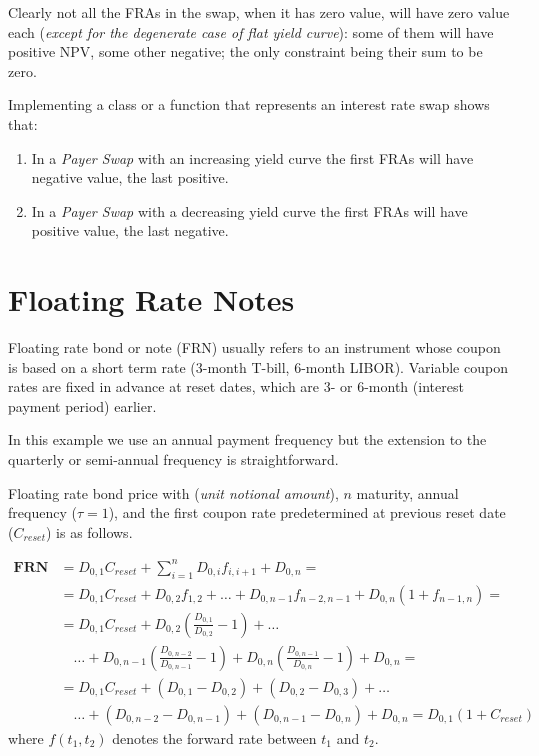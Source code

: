\documentclass[12pt,a4paper]{article}
\begin{document}
Clearly not all the FRAs in the swap, when it has zero value, will have zero value each (\emph{except for the degenerate case of flat yield curve}): some of them will have positive NPV, some other negative; the only constraint being their sum to be zero.

\begin{question}
Implementing a class or a function that represents an interest rate swap shows that:
\begin{enumerate}
\item In a \emph{Payer Swap} with an increasing yield curve the first FRAs will have negative value, the last positive. 
\item In a \emph{Payer Swap} with a decreasing yield curve the first FRAs will have positive value, the last negative.
\end{enumerate}
\end{question}

\clearpage
\section{Floating Rate Notes}
Floating rate bond or note (FRN) usually refers to an instrument whose coupon is based on a short term rate (3-month T-bill, 6-month LIBOR). Variable coupon rates are fixed in advance at reset dates, which are 3- or 6-month (interest payment period) earlier.

In this example we use an annual payment frequency but the extension to the quarterly or semi-annual frequency is straightforward.

Floating rate bond price with (\emph{unit notional amount}), $n$ maturity, annual frequency ($\tau=1$), and the first coupon rate predetermined at previous reset date ($C_{reset}$) is as follows.

\begin{equation}
	\begin{aligned}
		\textbf{FRN} & = D_{0,1}C_{reset} + \sum_{i=1}^nD_{0,i}f_{i,i+1} + D_{0,n}= \\
		& = D_{0,1}C_{reset} + D_{0,2}f_{1,2} + \ldots + D_{0,n-1}f_{n-2,n-1}+ D_{0,n}(1+f_{n-1,n}) = \\
		& = D_{0,1}C_{reset} + D_{0,2}\left(\frac{D_{0,1}}{D_{0,2}}-1\right) + \ldots \\
		&\quad\ldots + D_{0,n-1}\left(\frac{D_{0,n-2}}{D_{0,n-1}}-1\right) + D_{0,n}\left(\frac{D_{0,n-1}}{D_{0,n}}-1\right) + D_{0,n} = \\
		& = D_{0,1}C_{reset} + (D_{0,1} - D_{0,2}) + (D_{0,2} - D_{0,3}) + \ldots \\
		&\quad\ldots + (D_{0,n-2} - D_{0,n-1}) + (D_{0,n-1} - D_{0,n}) + D_{0,n} = \boxed{D_{0,1} (1 +C_{reset})}
	\end{aligned}
\end{equation}
where $f(t_1,t_2)$ denotes the forward rate between $t_1$ and $t_2$.
\end{document}
